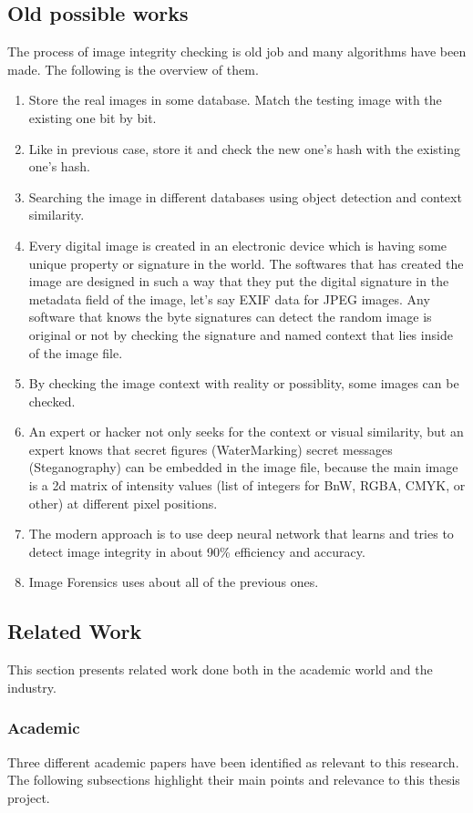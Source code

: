 \subsection{Old possible works}
The process of image integrity checking is old job and many algorithms have been made. The following is the overview of them.
\begin{enumerate}
\item Store the real images in some database. Match the testing image with the existing one bit by bit.
\item Like in previous case, store it and check the new one's hash with the existing one's hash.
\item Searching the image in different databases using object detection and context similarity.
\item Every digital image is created in an electronic device which is having some unique property or signature in the world. The softwares that has created the image are designed in such a way that they put the digital signature in the metadata field of the image, let's say EXIF data for JPEG images. Any software that knows the byte signatures can detect the random image is original or not by checking the signature and named context that lies inside of the image file.
\item By checking the image context with reality or possiblity, some images can be checked.
\item An expert or hacker not only seeks for the context or visual similarity, but an expert knows that secret figures (WaterMarking) secret messages (Steganography) can be embedded in the image file, because the main image is a 2d matrix of intensity values (list of integers for BnW, RGBA, CMYK, or other) at different pixel positions.
\item The modern approach is to use deep neural network that learns and tries to detect image integrity in about 90\% efficiency and accuracy.
\item Image Forensics uses about all of the previous ones.
\end{enumerate}

\subsection{Related Work}
This section presents related work done both in the academic world and the industry.
\subsubsection{Academic}
Three different academic papers have been identified as relevant to this research. The following subsections highlight their main points and relevance to this thesis project.
